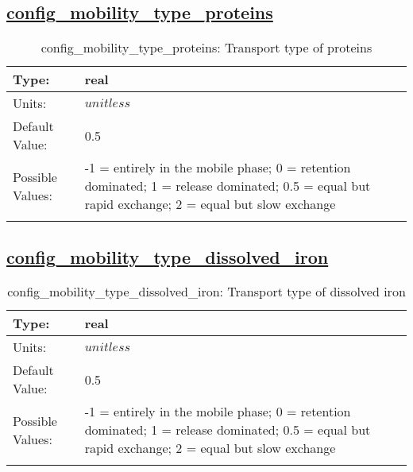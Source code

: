 \subsection[config\_mobility\_type\_proteins]{\hyperref[sec:nm_tab_biogeochemistry]{config\_mobility\_type\_proteins}}
\label{subsec:nm_sec_config_mobility_type_proteins}
\begin{center}
\begin{longtable}{| p{2.0in} || p{4.0in} |}
    \hline
    Type: & real \\
    \hline
    Units: & $unitless$ \\
    \hline
    Default Value: & 0.5 \\
    \hline
    Possible Values: & -1 = entirely in the mobile phase; 0 = retention dominated;     1 = release dominated; 0.5 = equal but rapid exchange;     2 = equal but slow exchange \\
    \hline
    \caption{config\_mobility\_type\_proteins: Transport type of proteins}
\end{longtable}
\end{center}
\subsection[config\_mobility\_type\_dissolved\_iron]{\hyperref[sec:nm_tab_biogeochemistry]{config\_mobility\_type\_dissolved\_iron}}
\label{subsec:nm_sec_config_mobility_type_dissolved_iron}
\begin{center}
\begin{longtable}{| p{2.0in} || p{4.0in} |}
    \hline
    Type: & real \\
    \hline
    Units: & $unitless$ \\
    \hline
    Default Value: & 0.5 \\
    \hline
    Possible Values: & -1 = entirely in the mobile phase; 0 = retention dominated;     1 = release dominated; 0.5 = equal but rapid exchange;     2 = equal but slow exchange \\
    \hline
    \caption{config\_mobility\_type\_dissolved\_iron: Transport type of dissolved iron}
\end{longtable}
\end{center}
